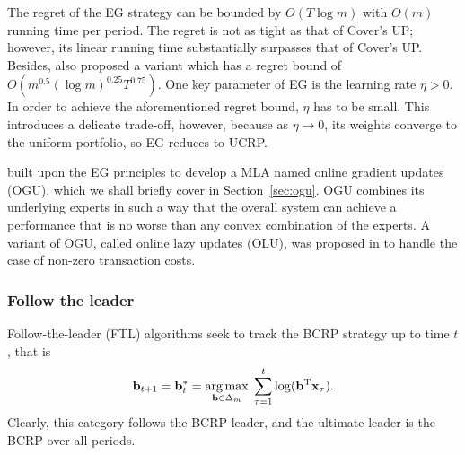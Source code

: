 %
%
%
%
%
%
%
%
%
%
%
%
%
%
%
%
%
%

The regret of the EG strategy can be bounded by $O(T \log m)$ with $O(m)$ running time per period. The regret is not as tight as that of Cover's UP; however, its linear running time substantially surpasses that of Cover's UP. Besides, \citet{eg} also proposed a variant which has a regret bound of $O(m^{0.5}(\log m)^{0.25} T^{0.75})$. One key parameter of EG is the learning rate $\eta > 0$. In order to achieve the aforementioned regret bound, $\eta$ has to be small. This introduces a delicate trade-off, however, because as $\eta \rightarrow 0$, its weights converge to the uniform portfolio, so EG reduces to UCRP.

\citet{das11} built upon the EG principles to develop a MLA named online gradient updates (OGU), which we shall briefly cover in Section~\ref{sec:ogu}. OGU combines its underlying experts in such a way that the overall system can achieve a performance that is no worse than any convex combination of the experts. A variant of OGU, called online lazy updates (OLU), was proposed in \citep{das13} to handle the case of non-zero transaction costs.

\subsubsection{Follow the leader}

Follow-the-leader (FTL) algorithms seek to track the BCRP strategy up to time $t$, that is
\begin{equation}
	\mathbf{b}_{t+1}
	= \mathbf{b}_{t}^* = \operatorname*{arg\,max}_{\mathbf{b}\in\Delta_m} \; \sum_{\tau=1}^t \log(\mathbf{b}^\text{T}\mathbf{x}_\tau).
\end{equation}
Clearly, this category follows the BCRP leader, and the ultimate leader is the BCRP over all periods.

